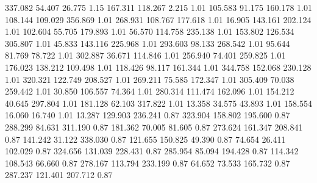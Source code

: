  337.082   54.407   26.775         1.15
 167.311  118.267    2.215         1.01
 105.583   91.175  160.178         1.01
 108.144  109.029  356.869         1.01
 268.931  108.767  177.618         1.01
  16.905  143.161  202.124         1.01
 102.604   55.705  179.893         1.01
  56.570  114.758  235.138         1.01
 153.802  126.534  305.807         1.01
  45.833  143.116  225.968         1.01
 293.603   98.133  268.542         1.01
  95.644   81.769   78.722         1.01
 302.887   36.671  114.846         1.01
 256.940   74.401  259.825         1.01
 176.023  138.212  109.498         1.01
 118.426   98.117  161.344         1.01
 344.758  152.068  230.128         1.01
 320.321  122.749  208.527         1.01
 269.211   75.585  172.347         1.01
 305.409   70.038  259.442         1.01
  30.850  106.557   74.364         1.01
 280.314  111.474  162.096         1.01
 154.212   40.645  297.804         1.01
 181.128   62.103  317.822         1.01
  13.358   34.575   43.893         1.01
 158.554   16.060   16.740         1.01
  13.287  129.903  236.241         0.87
 323.904  158.802  195.600         0.87
 288.299   84.631  311.190         0.87
 181.362   70.005   81.605         0.87
 273.624  161.347  208.841         0.87
 141.242   31.122  338.030         0.87
 121.655  150.825   49.390         0.87
  74.654   26.411  102.029         0.87
 324.656  131.039  228.431         0.87
 285.954   85.094  194.428         0.87
 114.342  108.543   66.660         0.87
 278.167  113.794  233.199         0.87
  64.652   73.533  165.732         0.87
 287.237  121.401  207.712         0.87
